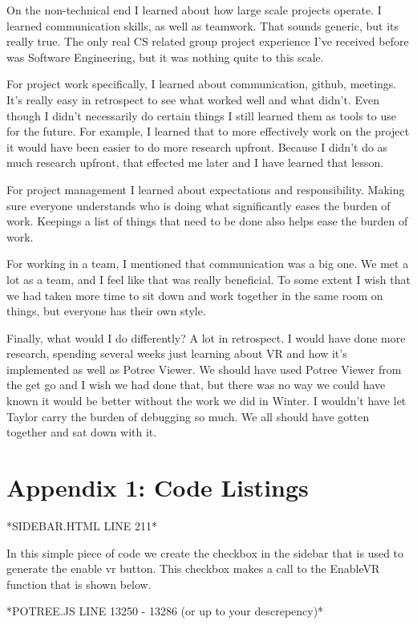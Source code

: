 \documentclass[draftclsnofoot,onecolumn]{IEEEtran}
\begin{document}
On the non-technical end I learned about how large scale projects operate.
I learned communication skills, as well as teamwork.
That sounds generic, but its really true.
The only real CS related group project experience I've received before was Software Engineering, but it was nothing quite to this scale.

For project work specifically, I learned about communication, github, meetings.
It's really easy in retrospect to see what worked well and what didn't. 
Even though I didn't necessarily do certain things I still learned them as tools to use for the future.
For example, I learned that to more effectively work on the project it would have been easier to do more research upfront. 
Because I didn't do as much research upfront, that effected me later and I have learned that lesson.

For project management I learned about expectations and responsibility.
Making sure everyone understands who is doing what significantly eases the burden of work.
Keepings a list of things that need to be done also helps ease the burden of work.

For working in a team, I mentioned that communication was a big one.
We met a lot as a team, and I feel like that was really beneficial.
To some extent I wish that we had taken more time to sit down and work together in the same room on things, but everyone has their own style.

Finally, what would I do differently? A lot in retrospect. 
I would have done more research, spending several weeks just learning about VR and how it's implemented as well as Potree Viewer.
We should have used Potree Viewer from the get go and I wish we had done that, but there was no way we could have known it would be better without the work we did in Winter.
I wouldn't have let Taylor carry the burden of debugging so much. We all should have gotten together and sat down with it.

\section{Appendix 1: Code Listings}

*SIDEBAR.HTML LINE 211*

In this simple piece of code we create the checkbox in the sidebar that is used to generate the enable vr button.
This checkbox makes a call to the EnableVR function that is shown below.

*POTREE.JS LINE 13250 - 13286 (or up to your descrepency)*
\end{document}
